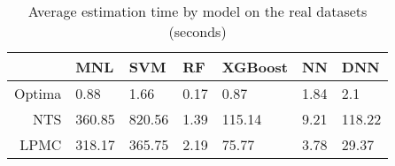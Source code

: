 \begin{table}
\centering
\caption{Average estimation time by model on the real datasets (seconds)}
\label{tab:experiment-4-time}
\begin{tabular}{rllllll}
\toprule
{} &     MNL &     SVM &    RF & XGBoost &    NN &     DNN \\
\midrule
Optima &    0.88 &    1.66 &  0.17 &    0.87 &  1.84 &     2.1 \\
NTS    &  360.85 &  820.56 &  1.39 &  115.14 &  9.21 &  118.22 \\
LPMC   &  318.17 &  365.75 &  2.19 &   75.77 &  3.78 &   29.37 \\
\bottomrule
\end{tabular}
\end{table}
